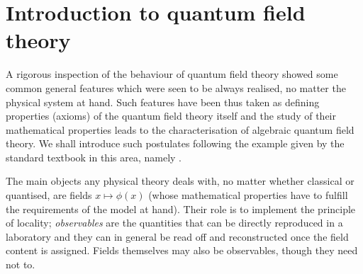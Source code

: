 \chapter{Introduction to quantum field theory}\label{ch:QFT}
\minitoc\mtcskip

\noindent A rigorous inspection of the behaviour of quantum field theory
showed some common general features which were seen to be 
always realised, no matter the physical system at hand.
Such features have been thus taken as defining properties 
(axioms) of the quantum field theory itself and the study of their 
mathematical properties leads to the characterisation 
of algebraic quantum field theory. We shall introduce such
postulates following the example given by the standard
textbook in this area, namely \cite*{Haag}.

\bigskip
The main objects any physical theory deals with, no matter
whether classical or quantised, are fields $x\mapsto\phi(x)$
(whose mathematical properties have to fulfill the requirements 
of the model at hand).
Their role is to implement the principle of locality; 
\emph{observables} are the quantities that can be directly
reproduced in a laboratory and they can in general be
read off and reconstructed once the field content is assigned.
Fields themselves may also be observables, though they need not to.


